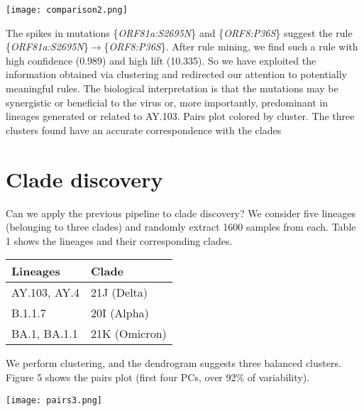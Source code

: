 \documentclass[a0,landscape]{a0poster}
\begin{document}
\begin{multicols}{4}
		\begin{center}\vspace{1cm}
			\texttt{[image: comparison2.png]}
		\end{center}\vspace{1cm}
		The spikes in mutations \{\textit{ORF81a:S2695N}\} and \{\textit{ORF8:P36S}\} suggest the rule \{\textit{ORF81a:S2695N}\}$\rightarrow$\{\textit{ORF8:P36S}\}.  After rule mining, we find such a rule with high confidence (0.989) and high lift (10.335). So we have exploited the information obtained via clustering and redirected our attention to potentially meaningful rules. The biological interpretation is that the mutations may be synergistic or beneficial to the virus or, more importantly, predominant in lineages generated or related to AY.103. Pairs plot colored by cluster. The three clusters found have an accurate correspondence with the clades
		\section*{Clade discovery}
		Can we apply the previous pipeline to clade discovery? We consider five lineages (belonging to three clades) and randomly extract 1600 samples from each. Table 1 shows the lineages and their corresponding clades.
		\begin{center}\vspace{1cm}
			\renewcommand{\arraystretch}{1.2} %
			\begin{tabular}{l l }
				\toprule
				\textbf{Lineages} & \textbf{Clade} \\
				\midrule
				AY.103, AY.4 & 21J (Delta)\\
				B.1.1.7 & 20I (Alpha) \\
				BA.1, BA.1.1 & 21K (Omicron) \\
				\bottomrule
			\end{tabular}
		\end{center}\vspace{1cm}
		We perform clustering, and the dendrogram suggests three balanced clusters. Figure 5 shows the pairs plot (first four PCs, over 92\% of variability).
		\begin{center}\vspace{1cm}
			\texttt{[image: pairs3.png]}
		\end{center}\vspace{1cm}
		

\end{multicols}
\end{document}
